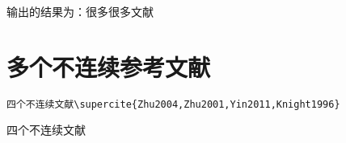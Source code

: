 输出的结果为：很多很多文献\supercite{Kivshar2008,John1987,Jing2010,Jeon2005,%
Jastrow2008,Jackson2008,Huttunen2005,Hou2008,Hilligsoe2004,%
Hassani2008,Han2002}



\section{多个不连续参考文献}
 \begin{verbatim}
四个不连续文献\supercite{Zhu2004,Zhu2001,Yin2011,Knight1996}
\end{verbatim}
四个不连续文献\supercite{Zhu2004,Zhu2001,Yin2011,Knight1996}
